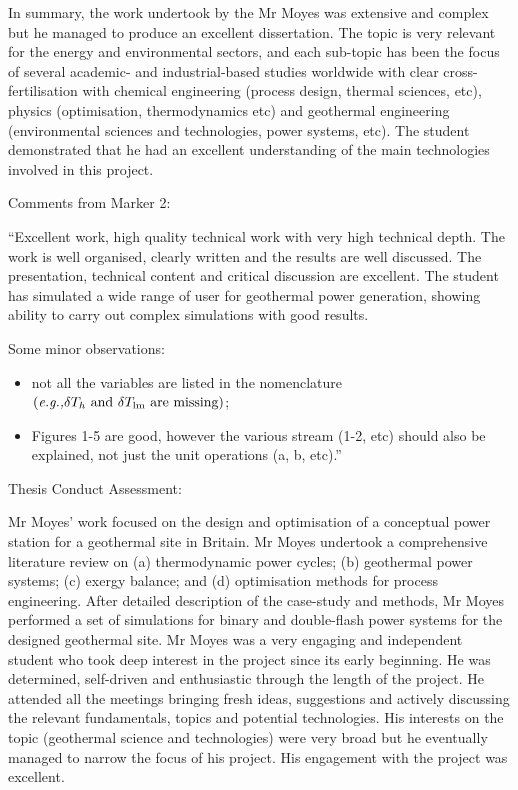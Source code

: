 \documentclass[14pt,twoside]{report}
\newcommand{\eg}{{\it e.g.,}}
\begin{document}
In summary, the work undertook by the Mr Moyes was extensive and complex but he managed to produce an excellent dissertation. The topic is very relevant for the energy and environmental sectors, and each sub-topic has been the focus of several academic- and industrial-based studies worldwide with clear cross-fertilisation with chemical engineering (process design, thermal sciences, etc), physics (optimisation, thermodynamics etc) and geothermal engineering (environmental sciences and technologies, power systems, etc). The student demonstrated that he had an excellent understanding of the main technologies involved in this project.

\bigskip

\noindent
    {\Large Comments from Marker 2:}

``Excellent work, high quality technical work with very high technical depth. The work is well organised, clearly written and the results are well discussed. The presentation, technical content and critical discussion are excellent. The student has simulated a wide range of user for geothermal power generation, showing ability to carry out complex simulations with good results.

\noindent
Some minor observations:
\begin{itemize}
 \item not all the variables are listed in the nomenclature $\left(\text{\eg }\delta T_{h} \text{ and } \delta T_{\text{lm}} \text{ are missing}\right)$;
 \item Figures 1-5 are good, however the various stream (1-2, etc) should also be explained, not just the unit operations (a, b, etc).''
\end{itemize}

\noindent

\clearpage

{\Large Thesis Conduct Assessment:}

\noindent
Mr Moyes' work focused on the design and optimisation of a conceptual power station for a geothermal site in Britain. Mr Moyes undertook a comprehensive literature review on (a) thermodynamic power cycles; (b) geothermal power systems; (c) exergy balance; and (d) optimisation methods for process engineering. After detailed description of the case-study and methods, Mr Moyes performed a set of simulations for binary and double-flash power systems for the designed geothermal site. Mr Moyes was a very engaging and independent student who took deep interest in the project since its early beginning. He was determined, self-driven and enthusiastic through the length of the project. He attended all the meetings bringing fresh ideas, suggestions and actively discussing the relevant fundamentals, topics and potential technologies. His interests on the topic (geothermal science and technologies) were very broad but he eventually managed to narrow the focus of his project. His engagement with the project was excellent. 
\end{document}
